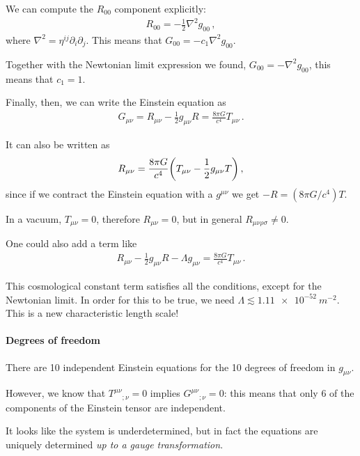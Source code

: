 \documentclass[main.tex]{subfiles}
\begin{document}
We can compute the \(R_{00} \) component explicitly: 
%
\begin{align}
R_{00} = - \frac{1}{2} \nabla^2 g_{00} 
\,,
\end{align}
%
where \(\nabla^2 = \eta^{ij} \partial_{i} \partial_{j}\). 
This means that \(G_{00} = - c_1 \nabla^2 g_{00} \). 

Together with the Newtonian limit expression we found, \(G_{00} = - \nabla^2 g_{00} \), this means that \(c_1 = 1\).

Finally, then, we can write the Einstein equation as 
%
\begin{align}
G_{\mu \nu } = R_{\mu \nu } - \frac{1}{2} g_{\mu \nu } R = \frac{8 \pi G}{c^{4}} T_{\mu \nu }
\,.
\end{align}

It can also be written as 
%
\begin{align}
R_{\mu \nu } = \frac{8 \pi G}{c^{4}} \qty(T_{\mu \nu } - \frac{1}{2} g_{\mu \nu } T)
\,,
\end{align}
%
since if we contract the Einstein equation with a \(g^{\mu \nu }\) we get \(-R = (8 \pi G / c^{4}) T\). 

In a vacuum, \(T_{\mu \nu } = 0\), therefore \(R_{\mu \nu } = 0\), but in general \(R_{\mu \nu \rho \sigma } \neq 0\). 

One could also add a term like 
%
\begin{align}
R_{\mu \nu } - \frac{1}{2} g_{\mu \nu } R - \Lambda g_{\mu \nu } = \frac{8 \pi G}{c^{4}} T_{\mu \nu }
\,.
\end{align}

This cosmological constant term satisfies all the conditions, except for the Newtonian limit. 
In order for this to be true, we need \(\Lambda \lesssim \SI{1.11e-52}{m^{-2}}\). 
This is a new characteristic length scale! 

\paragraph{Degrees of freedom}

There are 10 independent Einstein equations for the 10 degrees of freedom in \(g_{\mu \nu }\). 

However, we know that \(T^{\mu \nu }{}_{;\nu } = 0\) implies \(G^{\mu \nu }{}_{; \nu } = 0\): this means that only 6 of the components of the Einstein tensor are independent. 

It looks like the system is underdetermined, but
in fact the equations are uniquely determined 
\emph{up to a gauge transformation}. 
\end{document}
